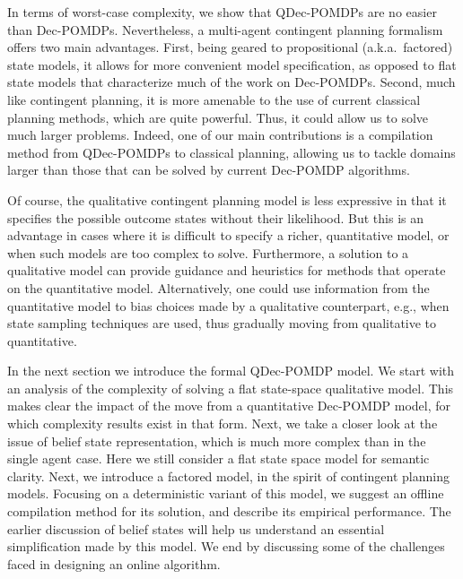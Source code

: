 \documentclass[letterpaper]{article}
\theoremstyle{definition}
\begin{document}
In terms of worst-case complexity, we show that QDec-POMDPs are no easier than Dec-POMDPs. %
Nevertheless, a multi-agent contingent planning formalism offers two main advantages. First, being geared to propositional (a.k.a.~factored) state models, it allows for more convenient model specification, as opposed to flat state models that characterize much of the work on Dec-POMDPs.  Second, much like contingent planning, it is more amenable to the use of current classical planning methods, which are quite powerful.
Thus, it could allow us to solve much larger problems. Indeed, one of our main contributions is a compilation method from QDec-POMDPs to classical planning, allowing us to tackle domains larger than those that can be solved by current Dec-POMDP algorithms.

Of course, the qualitative contingent planning model is less expressive in that it specifies the possible outcome states without their likelihood.  But this is an advantage in cases where it is difficult to specify a richer, quantitative model, or when such models are too complex to solve.  Furthermore, a solution to a qualitative model can provide guidance and heuristics for methods that operate on the quantitative model.  Alternatively, one could use information from the quantitative model to bias choices made by a qualitative counterpart, e.g., when state sampling techniques are used, thus gradually moving from qualitative to quantitative.

In the next section we introduce the formal QDec-POMDP model.  We start with an analysis of the complexity of solving a flat state-space qualitative model.  This makes clear the impact of the move from a quantitative Dec-POMDP model, for which
complexity results exist in that form. Next, we take a closer look at the issue of belief state representation, which is much more complex than in the single agent case. Here we still consider a flat state space model for semantic clarity.  Next, we introduce a factored model, in the spirit of contingent planning models. Focusing on a deterministic variant of this model, we suggest an offline compilation method for its solution, and describe its empirical performance. The earlier discussion of belief states will help us understand an essential simplification made by this model.  We end by discussing some of the challenges faced in designing an online algorithm.
\end{document}
